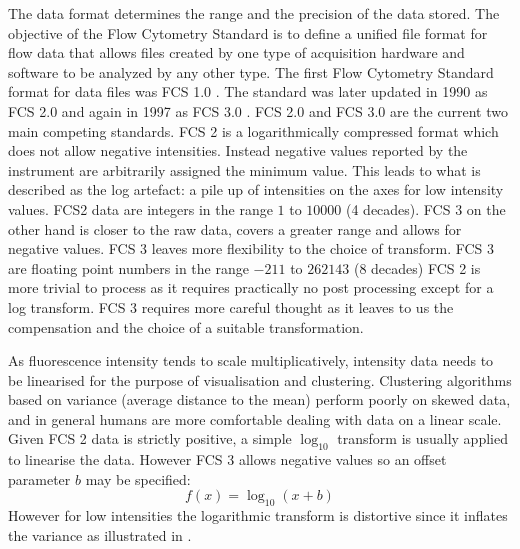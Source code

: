 The data format determines the range and the precision of the data stored.
The objective of the Flow Cytometry Standard is to define a unified file format for flow data
that allows files created by one type of acquisition hardware and software to be analyzed by any other type.
The first Flow Cytometry Standard format for data files was FCS 1.0 \citep{Murphy:1984ev}.
The standard was later updated in 1990 as FCS 2.0 \citep{Anon:1990ce} and again in 1997 as FCS 3.0 \citep{Anonymous:vr}.
FCS 2.0 and FCS 3.0 are the current two main competing standards.
FCS 2 is a logarithmically compressed format which does not allow negative intensities.  
Instead negative values reported by the instrument are arbitrarily assigned the minimum value.
This leads to what is described as the log artefact: a pile up of intensities on the axes for low intensity values.
FCS2 data are integers in the range $1$ to $10000$ (4 decades).
FCS 3 on the other hand is closer to the raw data, covers a greater range and allows for negative values.
FCS 3 leaves more flexibility to the choice of transform.
FCS 3 are floating point numbers in the range $-211$ to $262143$ (8 decades)
FCS 2 is more trivial to process as it requires practically no post processing except for a log transform.
FCS 3 requires more careful thought as it leaves to us the compensation and the choice of a suitable transformation.


As fluorescence intensity tends to scale multiplicatively, intensity data needs to be linearised for the purpose of visualisation and clustering.
Clustering algorithms based on variance (average distance to the mean) perform poorly on skewed data, and in general humans are more comfortable dealing
with data on a linear scale.
Given FCS 2 data is strictly positive, a simple $\log_{10}$ transform is usually applied to linearise the data.
However FCS 3 allows negative values so an offset parameter $b$ may be specified:
\[
    f(x) = \log_{10}(x+b)
\]
However for low intensities the logarithmic transform is distortive since it inflates the variance as illustrated in .


